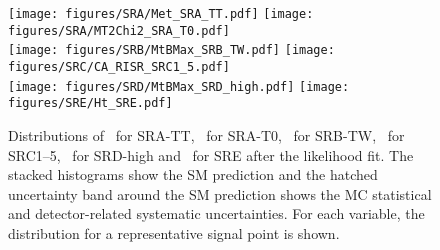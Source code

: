
\begin{figure}[h]
  \begin{center}
    \texttt{[image: figures/SRA/Met\_SRA\_TT.pdf]}
    \texttt{[image: figures/SRA/MT2Chi2\_SRA\_T0.pdf]}\\%
    \texttt{[image: figures/SRB/MtBMax\_SRB\_TW.pdf]}
    \texttt{[image: figures/SRC/CA\_RISR\_SRC1\_5.pdf]}\\%
    \texttt{[image: figures/SRD/MtBMax\_SRD\_high.pdf]}
    \texttt{[image: figures/SRE/Ht\_SRE.pdf]}
    \caption[Distribution of several kinematic variables in the signal regions]{Distributions of \met\ for SRA-TT, \mttwo\ for SRA-T0, \mtbmax\ for SRB-TW, \rISR\ for SRC1--5, \mtbmax\ for SRD-high and \HT\ for SRE after the likelihood fit. The stacked histograms show the SM prediction and the hatched uncertainty band around the SM prediction shows the MC statistical and detector-related systematic uncertainties. For each variable, the distribution for a representative signal point is shown.}
    \label{fig:SRs}
  \end{center}
\end{figure}
\clearpage

